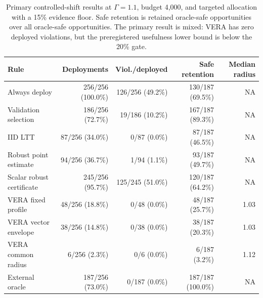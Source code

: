 \begin{table}[t]
\centering
\small
\begin{tabular}{@{}lrrrr@{}}
\toprule
Rule & Deployments & Viol./deployed & Safe retention & Median radius \\
\midrule
Always deploy & 256/256 (100.0\%) & 126/256 (49.2\%) & 130/187 (69.5\%) & NA \\
Validation selection & 186/256 (72.7\%) & 19/186 (10.2\%) & 167/187 (89.3\%) & NA \\
IID LTT & 87/256 (34.0\%) & 0/87 (0.0\%) & 87/187 (46.5\%) & NA \\
Robust point estimate & 94/256 (36.7\%) & 1/94 (1.1\%) & 93/187 (49.7\%) & NA \\
Scalar robust certificate & 245/256 (95.7\%) & 125/245 (51.0\%) & 120/187 (64.2\%) & NA \\
VERA fixed profile & 48/256 (18.8\%) & 0/48 (0.0\%) & 48/187 (25.7\%) & 1.03 \\
VERA vector envelope & 38/256 (14.8\%) & 0/38 (0.0\%) & 38/187 (20.3\%) & 1.03 \\
VERA common radius & 6/256 (2.3\%) & 0/6 (0.0\%) & 6/187 (3.2\%) & 1.12 \\
External oracle & 187/256 (73.0\%) & 0/187 (0.0\%) & 187/187 (100.0\%) & NA \\
\bottomrule
\end{tabular}
\caption{Primary controlled-shift results at $\Gamma=1.1$, budget 4,000, and targeted allocation with a 15\% evidence floor. Safe retention is retained oracle-safe opportunities over all oracle-safe opportunities. The primary result is mixed: VERA has zero deployed violations, but the preregistered usefulness lower bound is below the 20\% gate.}
\label{tab:controlled-main}
\end{table}
